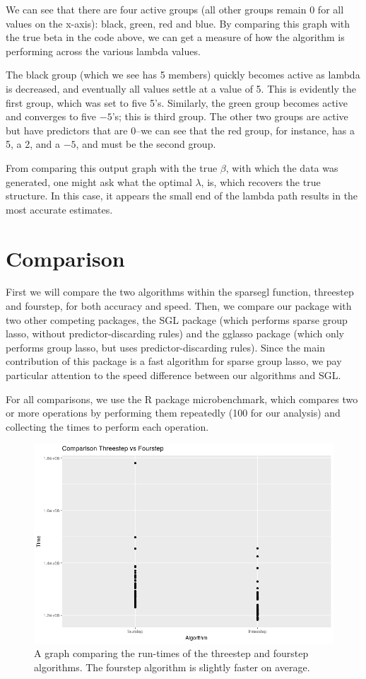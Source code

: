 \documentclass[12pt]{article}
\begin{document}
We can see that there are four active groups (all other groups remain 0 for all values on the x-axis): black, green, red and blue. By comparing this graph with the true beta in the code above, we can get a measure of how the algorithm is performing across the various lambda values.

The black group (which we see has 5 members) quickly becomes active as lambda is decreased, and eventually all values settle at a value of 5. This is evidently the first group, which was set to five 5's. Similarly, the green group becomes active and converges to five $-5$'s; this is third group. The other two groups are active but have predictors that are 0--we can see that the red group, for instance, has a 5, a 2, and a $-5$, and must be the second group.

From comparing this output graph with the true $\beta$, with which the data was generated, one might ask what the optimal $\lambda$, is, which recovers the true structure. In this case, it appears the small end of the lambda path results in the most accurate estimates.


\section{Comparison}

First we will compare the two algorithms within the sparsegl function, threestep and fourstep, for both accuracy and speed. Then, we compare our package with two other competing packages, the SGL package (which performs sparse group lasso, without predictor-discarding rules) and the gglasso package (which only performs group lasso, but uses predictor-discarding rules). Since the main contribution of this package is a fast algorithm for sparse group lasso, we pay particular attention to the speed difference between our algorithms and SGL.

For all comparisons, we use the R package microbenchmark, which compares two or more operations by performing them repeatedly (100 for our analysis) and collecting the times to perform each operation.

\begin{figure}[tb!]
\centering
\includegraphics[scale=0.5]{threevsfour.png}
\caption{A graph comparing the run-times of the threestep and fourstep algorithms. The fourstep algorithm is slightly faster on average.}
\label{fig:threevsfour}
\end{figure}
\end{document}

